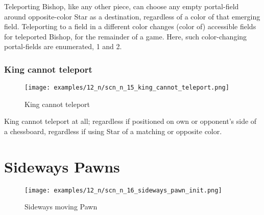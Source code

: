 Teleporting Bishop, like any other piece, can choose any empty portal-field
around opposite-color Star as a destination, regardless of a color of that
emerging field. Teleporting to a field in a different color changes (color of)
accessible fields for teleported Bishop, for the remainder of a game. Here,
such color-changing portal-fields are enumerated, 1 and 2.

\clearpage %

\subsubsection*{King cannot teleport}
\label{sec:Nineteen/Star/Teleporting pieces/King cannot teleport}

\vspace*{-1.4\baselineskip}
\noindent
\begin{figure}[!h]
\texttt{[image: examples/12\_n/scn\_n\_15\_king\_cannot\_teleport.png]}
\caption{King cannot teleport}
\label{fig:scn_n_15_king_cannot_teleport}
\end{figure}

King cannot teleport at all; regardless if positioned on own or opponent's side
of a chessboard, regardless if using Star of a matching or opposite color.

\clearpage %

\section*{Sideways Pawns}
\label{sec:Nineteen/Sideways Pawns}

\vspace*{-1.5\baselineskip}
\noindent
\begin{figure}[!h]
\texttt{[image: examples/12\_n/scn\_n\_16\_sideways\_pawn\_init.png]}
\vspace*{-1.4\baselineskip}
\caption{Sideways moving Pawn}
\label{fig:scn_n_16_sideways_pawn_init}
\end{figure}

